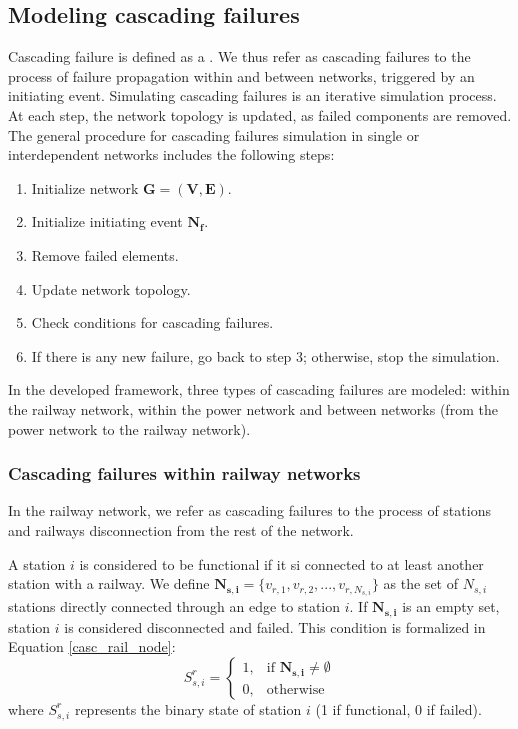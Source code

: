 \documentclass[review]{elsarticle}
\begin{document}
	\subsection{Modeling cascading failures}
	Cascading failure is defined as a  \cite{mahmoud2019networked}. We thus refer as cascading failures to the process of failure propagation within and between networks, triggered by an initiating event. Simulating cascading failures is an iterative simulation process. At each step, the network topology is updated, as failed components are removed. The general procedure for cascading failures simulation in single or interdependent networks includes the following steps:
        \begin{enumerate}
            \item Initialize network $\mathbf{G}=(\mathbf{V},\mathbf{E})$.
            \item Initialize initiating event $\mathbf{N_f}$.
            \item Remove failed elements.
            \item Update network topology.
            \item Check conditions for cascading failures.
            \item If there is any new failure, go back to step 3; otherwise, stop the simulation.
 \end{enumerate}
In the developed framework, three types of cascading failures are modeled: within the railway network, within the power network and between networks (from the power network to the railway network).
	\subsubsection{Cascading failures within railway networks}
	In the railway network, we refer as cascading failures to the process of stations and railways disconnection from the rest of the network.
	
	A station $i$ is considered to be functional if it si connected to at least another station with a railway. We define $\mathbf{N_{s,i}} = \{ v_{r,1}, v_{r,2},...,v_{r,N_{s,i}} \}$ as the set of $N_{s,i}$ stations directly connected through an edge to station $i$. If $\mathbf{N_{s,i}}$ is an empty set, station $i$ is considered disconnected and failed. This condition is formalized in Equation \ref{casc_rail_node}:
	\begin{equation}
	     S^r_{s,i} =
  \begin{cases}
    1, & \text{if $\mathbf{N_{s,i}} \ne \emptyset$}\\
    0, & \text{otherwise}
  \end{cases}
  \label{casc_rail_node}
	\end{equation}
where $S^r_{s,i}$ represents the binary state of station $i$ (1 if functional, 0 if failed).
\end{document}
